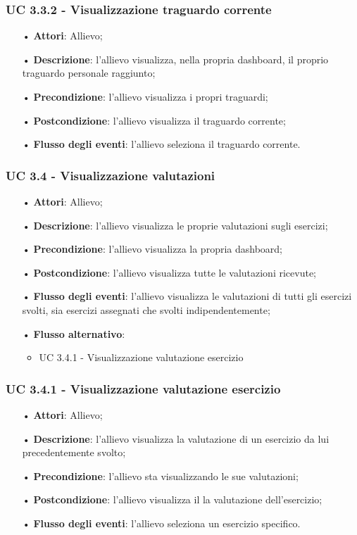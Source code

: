 \subsubsection{UC 3.3.2 - Visualizzazione traguardo corrente}
\begin{itemize}
\item[•]\textbf{Attori}: Allievo;
\item[•] \textbf{Descrizione}: l'allievo visualizza, nella propria dashboard, il proprio traguardo personale raggiunto;
\item[•] \textbf{Precondizione}: l'allievo visualizza i propri traguardi;
\item[•] \textbf{Postcondizione}: l'allievo visualizza il traguardo corrente;
\item[•] \textbf{Flusso degli eventi}: l'allievo seleziona il traguardo corrente.
\end{itemize}


\subsubsection{UC 3.4 - Visualizzazione valutazioni}
\begin{itemize}
\item[•]\textbf{Attori}: Allievo;
\item[•]\textbf{Descrizione}: l'allievo visualizza le proprie valutazioni sugli esercizi;
\item[•]\textbf{Precondizione}: l'allievo visualizza la propria dashboard;
\item[•]\textbf{Postcondizione}: l'allievo visualizza tutte le valutazioni ricevute;
\item[•]\textbf{Flusso degli eventi}: l'allievo visualizza le valutazioni di tutti gli esercizi svolti, sia esercizi assegnati che svolti indipendentemente;
\item[•] \textbf{Flusso alternativo}: 
	\begin{itemize}
		\item UC 3.4.1 - Visualizzazione valutazione esercizio		
	\end{itemize}
\end{itemize}

\subsubsection{UC 3.4.1 - Visualizzazione valutazione esercizio}
\begin{itemize}
\item[•]\textbf{Attori}: Allievo;
\item[•]\textbf{Descrizione}: l'allievo visualizza la valutazione di un esercizio da lui precedentemente svolto;
\item[•]\textbf{Precondizione}: l'allievo sta visualizzando le sue valutazioni;
\item[•]\textbf{Postcondizione}: l'allievo visualizza il la valutazione dell'esercizio;
\item[•]\textbf{Flusso degli eventi}: l'allievo seleziona un esercizio specifico.
\end{itemize}


